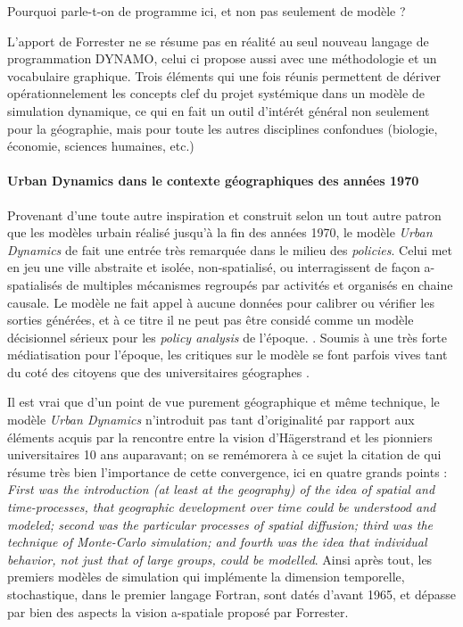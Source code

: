 Pourquoi parle-t-on de programme ici, et non pas seulement de modèle ? 

L'apport de Forrester ne se résume pas en réalité au seul nouveau langage de programmation DYNAMO, celui ci propose aussi avec une méthodologie et un vocabulaire graphique. Trois éléments qui une fois réunis permettent de dériver opérationnelement les concepts clef du projet systémique dans un modèle de simulation dynamique, ce qui en fait un outil d'intérét général non seulement pour la géographie, mais pour toute les autres disciplines confondues (biologie, économie, sciences humaines, etc.) \autocite{Rosnay1975}

\paragraph{Urban Dynamics dans le contexte géographiques des années 1970}

Provenant d'une toute autre inspiration et construit selon un tout autre patron que les modèles urbain réalisé jusqu'à la fin des années 1970, le modèle \textit{Urban Dynamics} de \textcite{Forrester1969} fait une entrée très remarquée dans le milieu des \textit{policies}. Celui met en jeu une ville abstraite et isolée, non-spatialisé, ou interragissent de façon a-spatialisés de multiples mécanismes regroupés par activités et organisés en chaine causale. Le modèle ne fait appel à aucune données pour calibrer ou vérifier les sorties générées, et à ce titre il ne peut pas être considé comme un modèle décisionnel sérieux pour les \textit{policy analysis} de l'époque. \autocite{Lee1973}. Soumis à une très forte médiatisation pour l'époque, les critiques sur le modèle se font parfois vives tant du coté des citoyens \autocite{Forrester1989, Forrester2007} que des universitaires géographes \autocite{Tobler1970a, Berry1970, Batty1971}.

Il est vrai que d'un point de vue purement géographique et même technique, le modèle \textit{Urban Dynamics} n'introduit pas tant d'originalité par rapport aux éléments acquis par la rencontre entre la vision d'Hägerstrand et les pionniers universitaires 10 ans auparavant; on se remémorera à ce sujet la citation de \textcite{Morril2005} qui résume très bien l'importance de cette convergence, ici en quatre grands points : \textit{First was the introduction (at least at the geography) of the idea of spatial and time-processes, that geographic development over time could be understood and modeled; second was the particular processes of spatial diffusion; third was the technique of Monte-Carlo simulation; and fourth was the idea that individual behavior, not just that of large groups, could be modelled}. Ainsi après tout, les premiers modèles de simulation qui implémente la dimension temporelle, stochastique, dans le premier langage Fortran, sont datés d'avant 1965, et dépasse par bien des aspects la vision a-spatiale proposé par Forrester.

